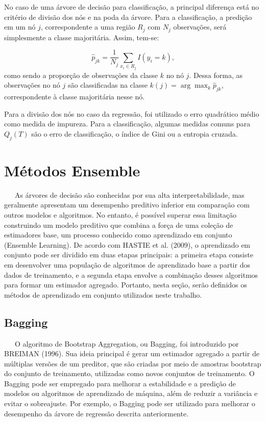 \documentclass[
  12pt,
  a4paper,
]{scrreprt}
\begin{document}
\vspace{12pt}

No caso de uma árvore de decisão para classificação, a principal
diferença está no critério de divisão dos nós e na poda da árvore. Para
a classificação, a predição em um nó \(j\), correspondente a uma região
\(R_j\) com \(N_j\) observações, será simplesmente a classe majoritária.
Assim, tem-se:

\[
\hat{p}_{jk} = \frac{1}{N_j}\sum_{x_i \in R_j} I\left(y_i = k\right)\text{,}
\] como sendo a proporção de observações da classe \(k\) no nó \(j\).
Dessa forma, as observações no nó \(j\) são classificadas na classe
\(k\left(j\right) = \arg \max_{k} \hat{p}_{jk}\), correspondente à
classe majoritária nesse nó.

\vspace{12pt}

Para a divisão dos nós no caso da regressão, foi utilizado o erro
quadrático médio como medida de impureza. Para a classificação, algumas
medidas comuns para \(Q_j\left(T\right)\) são o erro de classificação, o
índice de Gini ou a entropia cruzada.

\section{Métodos Ensemble}\label{muxe9todos-ensemble}

~~~As árvores de decisão são conhecidas por sua alta interpretabilidade,
mas geralmente apresentam um desempenho preditivo inferior em comparação
com outros modelos e algoritmos. No entanto, é possível superar essa
limitação construindo um modelo preditivo que combina a força de uma
coleção de estimadores base, um processo conhecido como aprendizado em
conjunto (Ensemble Learning). De acordo com HASTIE et al. (2009), o
aprendizado em conjunto pode ser dividido em duas etapas principais: a
primeira etapa consiste em desenvolver uma população de algoritmos de
aprendizado base a partir dos dados de treinamento, e a segunda etapa
envolve a combinação desses algoritmos para formar um estimador
agregado. Portanto, nesta seção, serão definidos os métodos de
aprendizado em conjunto utilizados neste trabalho.

\subsection{Bagging}\label{bagging}

~~~O algoritmo de Bootstrap Aggregation, ou Bagging, foi introduzido por
BREIMAN (1996). Sua ideia principal é gerar um estimador agregado a
partir de múltiplas versões de um preditor, que são criadas por meio de
amostras bootstrap do conjunto de treinamento, utilizadas como novos
conjuntos de treinamento. O Bagging pode ser empregado para melhorar a
estabilidade e a predição de modelos ou algoritmos de aprendizado de
máquina, além de reduzir a variância e evitar o sobreajuste. Por
exemplo, o Bagging pode ser utilizado para melhorar o desempenho da
árvore de regressão descrita anteriormente.
\end{document}
